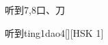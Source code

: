 \begin{entry}{听到}{7,8}{⼝、⼑}
  \begin{phonetics}{听到}{ting1dao4}[][HSK 1]
  \end{phonetics}
\end{entry}
